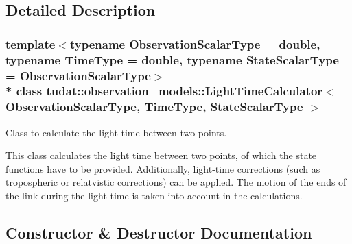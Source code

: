 \subsection{Detailed Description}
\subsubsection*{template$<$typename Observation\+Scalar\+Type = double, typename Time\+Type = double, typename State\+Scalar\+Type = Observation\+Scalar\+Type$>$\\*
class tudat\+::observation\+\_\+models\+::\+Light\+Time\+Calculator$<$ Observation\+Scalar\+Type, Time\+Type, State\+Scalar\+Type $>$}

Class to calculate the light time between two points. 

This class calculates the light time between two points, of which the state functions have to be provided. Additionally, light-\/time corrections (such as tropospheric or relatvistic corrections) can be applied. The motion of the ends of the link during the light time is taken into account in the calculations. 

\subsection{Constructor \& Destructor Documentation}

